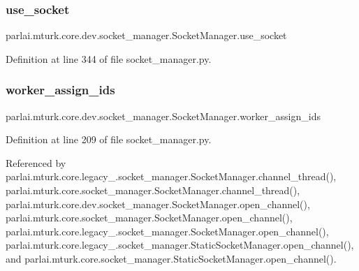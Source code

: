 \subsubsection{\texorpdfstring{use\+\_\+socket}{use\_socket}}
{\footnotesize\ttfamily parlai.\+mturk.\+core.\+dev.\+socket\+\_\+manager.\+Socket\+Manager.\+use\+\_\+socket}



Definition at line 344 of file socket\+\_\+manager.\+py.

\mbox{\label{classparlai_1_1mturk_1_1core_1_1dev_1_1socket__manager_1_1SocketManager_ab385890b2361f4eacf67d60584ce99fa}} 
\subsubsection{\texorpdfstring{worker\+\_\+assign\+\_\+ids}{worker\_assign\_ids}}
{\footnotesize\ttfamily parlai.\+mturk.\+core.\+dev.\+socket\+\_\+manager.\+Socket\+Manager.\+worker\+\_\+assign\+\_\+ids}



Definition at line 209 of file socket\+\_\+manager.\+py.



Referenced by parlai.\+mturk.\+core.\+legacy\+\_.\+socket\+\_\+manager.\+Socket\+Manager.\+channel\+\_\+thread(), parlai.\+mturk.\+core.\+socket\+\_\+manager.\+Socket\+Manager.\+channel\+\_\+thread(), parlai.\+mturk.\+core.\+dev.\+socket\+\_\+manager.\+Socket\+Manager.\+open\+\_\+channel(), parlai.\+mturk.\+core.\+socket\+\_\+manager.\+Socket\+Manager.\+open\+\_\+channel(), parlai.\+mturk.\+core.\+legacy\+\_.\+socket\+\_\+manager.\+Socket\+Manager.\+open\+\_\+channel(), parlai.\+mturk.\+core.\+legacy\+\_.\+socket\+\_\+manager.\+Static\+Socket\+Manager.\+open\+\_\+channel(), and parlai.\+mturk.\+core.\+socket\+\_\+manager.\+Static\+Socket\+Manager.\+open\+\_\+channel().

\mbox{\label{classparlai_1_1mturk_1_1core_1_1dev_1_1socket__manager_1_1SocketManager_afa9d3d4ea7546166a2017e312c8cdccd}} 
